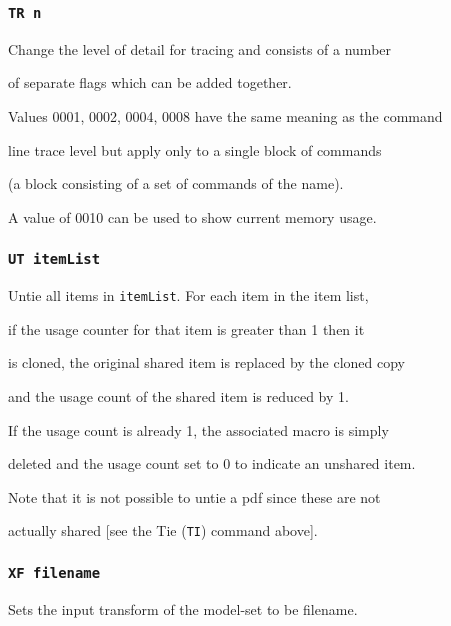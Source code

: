 \subsubsection*{\tt TR n}





Change the level of detail for tracing and consists of a number


of separate flags which can be added together.


Values 0001, 0002, 0004, 0008 have the same meaning as the command


line trace level but apply only to a single block of commands


(a block consisting of a set of commands of the name).


A value of 0010 can be used to show current memory usage.





\subsubsection*{\tt UT itemList}





Untie all items in \texttt{itemList}.  For each item in the item list,


if the usage counter for that item is greater than 1 then it


is cloned, the original shared item is replaced by the cloned copy


and the usage count of the shared item is reduced by 1. 


If the usage count is already 1, the associated macro is simply


deleted and the usage count set to 0 to indicate an unshared item.


Note that it is not possible to untie a pdf since these are not


actually shared [see the Tie (\texttt{TI}) command above].





\subsubsection*{\tt XF filename}





Sets the input transform of the model-set to be filename.





